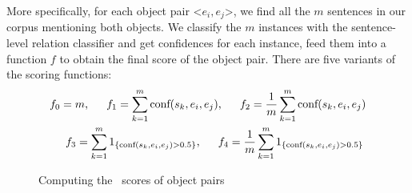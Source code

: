 More specifically, for each object pair \textless$e_i,e_j$\textgreater, 
we find all the $m$ sentences in our corpus mentioning both objects.
We classify the $m$ instances with the sentence-level relation classifier and get confidences for each instance, 
feed them into a function $f$ to obtain the final score 
of the object pair. 
There are five variants of the scoring functions:
\begin{align*}
	f_0=m \textnormal{,~~~~~}
	f_1=\sum_{k=1}^{m}\textnormal{conf}(s_k,e_i,e_j)&
	\textnormal{,~~}{~~~}f_2=\frac{1}{m}\sum_{k=1}^{m}\textnormal{conf}(s_k,e_i,e_j)
	\\
	f_3=\sum_{k=1}^{m}1_{\{\textnormal{conf}(s_k,e_i,e_j)>0.5\}}\textnormal{,~~~~~}&
	f_4=\frac{1}{m}\sum_{k=1}^{m}1_{ \{ \textnormal{conf}(s_k,e_i,e_j)>0.5 \}} \\
\end{align*}
\vspace{-20pt}
\begin{figure*}[th]
	\centering
	\caption{Computing the \lnear\ scores of object pairs}
	\label{fig:overview}
\end{figure*}


